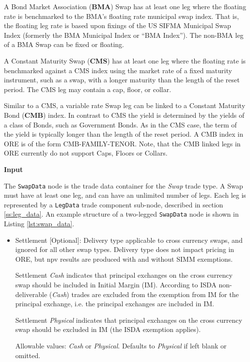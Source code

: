 {A Bond Market Association ({\bf BMA}) Swap has at least one leg where the floating rate 
is benchmarked to the BMA's floating rate municipal swap index. That is, 
the floating leg rate is based upon fixings of the US SIFMA Municipal Swap Index 
(formerly the BMA Municipal Index or ``BMA Index''). The non-BMA leg of a BMA Swap 
can be fixed or floating.

A Constant Maturity Swap ({\bf CMS}) has at least one leg where the floating rate is 
benchmarked against a CMS index using the market rate of a fixed maturity 
instrument, such as a swap, with a longer maturity than the 
length of the reset period. The CMS leg may contain a cap, floor, or collar. 

Similar to a CMS, a variable rate Swap leg can be linked to a Constant Maturity Bond ({\bf CMB}) index.
In contrast to CMS the yield is determined by the yields of a class of Bonds, such as Government Bonds.
As in the CMS case, the term of the yield is typically longer than the length of the reset period.
A CMB index in ORE is of the form CMB-FAMILY-TENOR.
Note, that the CMB linked legs in ORE currently do not support Caps, Floors or Collars.

{\bf Input}}\fi

The \lstinline!SwapData! node is the trade data container for the \emph{Swap} trade type. A Swap must have at least one leg,
and can have an unlimited number of legs. Each leg is represented by a \lstinline!LegData! trade component sub-node,
described in section \ref{ss:leg_data}. An example structure of a two-legged \lstinline!SwapData!
node is shown in Listing \ref{lst:swap_data}.
\begin{itemize}
\item Settlement [Optional]: Delivery type applicable to cross currency swaps, and ignored for all other swap types. Delivery type does not impact pricing in ORE, but npv results are produced with and without SIMM exemptions.  

Settlement \emph{Cash} indicates that principal exchanges on the cross currency swap should be included in Initial Margin (IM). According to ISDA non-deliverable (\emph{Cash}) trades are excluded from the exemption from IM for the principal exchange, i.e. the principal exchanges are included in IM. 

Settlement \emph{Physical} indicates that principal exchanges on the cross currency swap should be excluded in IM (the ISDA exemption applies).  

Allowable values: \emph{Cash} or \emph{Physical}.  Defaults to \emph{Physical} if left blank or omitted.
\end{itemize}


